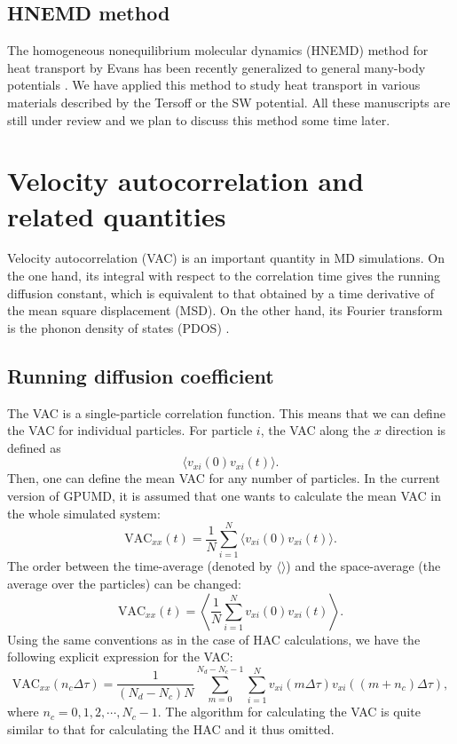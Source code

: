 \documentclass[12pt,a4paper]{report}
\begin{document}
\subsection{HNEMD method}

The homogeneous nonequilibrium molecular dynamics (HNEMD) method for heat transport by Evans \cite{evans1982pla} has been recently generalized to general many-body potentials \cite{fan2018submitted}. We have applied \cite{xu2018submitted,dong2018pccp} this method to study heat transport in various materials described by the Tersoff or the SW potential. All these manuscripts are still under review and we plan to discuss this method some time later.  

\section{Velocity autocorrelation and related quantities}

Velocity autocorrelation (VAC) is an important quantity in MD simulations. On the one hand, its integral with respect to the correlation time gives the running diffusion constant, which is equivalent to that obtained by a time derivative of the mean square displacement (MSD). On the other hand, its Fourier transform is the phonon density of states (PDOS) \cite{dickey1969pr}.

\subsection{Running diffusion coefficient}

The VAC is a single-particle correlation function. This means that we can define the VAC for individual particles. For particle $i$, the VAC along the $x$ direction is defined as
\begin{equation}
\langle v_{xi}(0) v_{xi}(t) \rangle.
\end{equation}
Then, one can define the mean VAC for any number of particles. In the current version of GPUMD, it is assumed that one wants to calculate the mean VAC in the whole simulated system:
\begin{equation}
\boxed{
\text{VAC}_{xx}(t) =
\frac{1}{N} \sum_{i=1}^{N} \langle v_{xi}(0) v_{xi}(t) \rangle
}.
\end{equation}
The order between the time-average (denoted by $\langle \rangle$) and the space-average (the average over the particles) can be changed:
\begin{equation}
\boxed{
\text{VAC}_{xx}(t) =
\left\langle \frac{1}{N} \sum_{i=1}^{N}  v_{xi}(0) v_{xi}(t) \right\rangle
}.
\end{equation}
Using the same conventions as in the case of HAC calculations, we have
the following explicit expression for the VAC:
\begin{equation}
\label{equation:VAC}
\text{VAC}_{xx}(n_c\Delta \tau) = \frac{1}{(N_d-N_c)N}
\sum_{m=0}^{N_d-N_c-1} \sum_{i=1}^{N}
v_{xi}(m\Delta \tau) v_{xi}((m+n_c)\Delta \tau),
\end{equation}
where $n_c = 0, 1, 2, \cdots, N_c-1$.
The algorithm for calculating the VAC is quite similar to that for calculating the HAC and it thus omitted.
\end{document}
